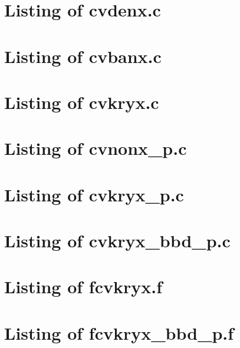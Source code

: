 
\newpage
\section{Listing of cvdenx.c}\label{s:cvdenx_c}

\newpage
\section{Listing of cvbanx.c}\label{s:cvbanx_c}

\newpage
\section{Listing of cvkryx.c}\label{s:cvkryx_c}


\newpage
\section{Listing of cvnonx\_p.c}\label{s:cvnonx_p_c}

\newpage
\section{Listing of cvkryx\_p.c}\label{s:cvkryx_p_c}

\newpage
\section{Listing of cvkryx\_bbd\_p.c}\label{s:cvkryx_bbd_p_c}


\newpage
\section{Listing of fcvkryx.f}\label{s:fcvkryx_f}

\newpage
\section{Listing of fcvkryx\_bbd\_p.f}\label{s:fcvkryx_bbd_p_f}


